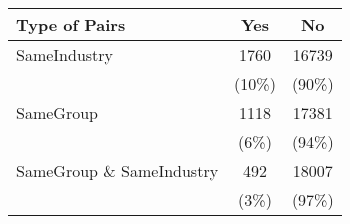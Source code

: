 
    \begin{tabular}{lcc}\hline\hline
    {Type of Pairs} & {Yes} &{No} \\
    \hline
    \addlinespace
    {SameIndustry} & 1760  & 16739 \\
          & \tiny(10\%) & \tiny (90\%) \\
          \addlinespace
{SameGroup} & 1118  & 17381 \\
          & \tiny(6\%) & \tiny (94\%) \\
          \addlinespace
{SameGroup \& SameIndustry} & 492  & 18007 \\
          & \tiny(3\%) & \tiny (97\%) \\    
                
          \hline\hline
    \end{tabular}%